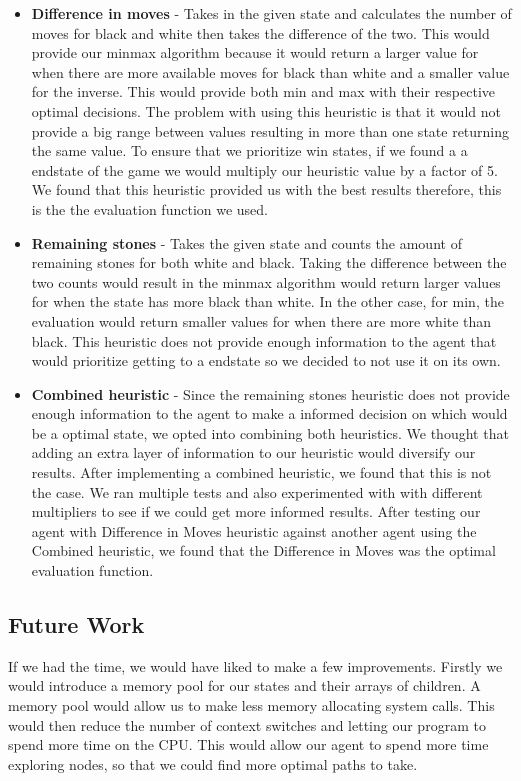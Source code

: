 \documentclass[12pt]{article}
\begin{document}
\begin{itemize}
\item \textbf{Difference in moves} -
Takes in the given state and calculates the number of moves for black and white then takes the difference of the two. 
This would provide our minmax algorithm because it would return a larger value for when there are more available moves for black than white and a smaller value for the inverse.
This would provide both min and max with their respective optimal decisions.
The problem with using this heuristic is that it would not provide a big range between values resulting in more than one state returning the same value.
To ensure that we prioritize win states, if we found a a endstate of the game we would multiply our heuristic value by a factor of 5.
We found that this heuristic provided us with the best results therefore, this is the the evaluation function we used.

\item \textbf{Remaining stones} -
Takes the given state and counts the amount of remaining stones for both white and black.
Taking the difference between the two counts would result in the minmax algorithm would return larger values for when the state has more black than white.
In the other case, for min, the evaluation would return smaller values for when there are more white than black.
This heuristic does not provide enough information to the agent that would prioritize getting to a endstate so we decided to not use it on its own.

\item \textbf{Combined heuristic} - 
Since the remaining stones heuristic does not provide enough information to the agent to make a informed decision on which would be a optimal state, we opted into combining both heuristics.
We thought that adding an extra layer of information to our heuristic would diversify our results.
After implementing a combined heuristic, we found that this is not the case.
We ran multiple tests and also experimented with with different multipliers to see if we could get more informed results.
After testing our agent with Difference in Moves heuristic against another agent using the Combined heuristic, we found that the Difference in Moves was the optimal evaluation function.

\end{itemize}

\subsection*{Future Work}
If we had the time, we would have liked to make a few improvements.
Firstly we would introduce a memory pool for our states and their arrays of children.
A memory pool would allow us to make less memory allocating system calls.
This would then reduce the number of context switches and letting our program to spend more time on the CPU.
This would allow our agent to spend more time exploring nodes, so that we could find more optimal paths to take.
\end{document}
